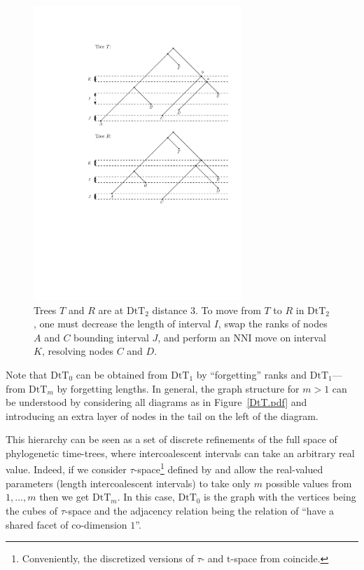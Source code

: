 \documentclass{amsart}
\theoremstyle{definition}
\newcommand{\dtt}{\mathrm{DtT}}
\begin{document}
\begin{figure}[ht]
\centering
\includegraphics[width=0.7\textwidth]{dts_neighbors.pdf}
\caption{Trees $T$ and $R$ are at $\dtt_2$ distance $3$.
To move from $T$ to $R$ in $\dtt_2$, one must decrease the length of interval $I$, swap the ranks of nodes $A$ and $C$ bounding interval $J$, and perform an NNI move on interval $K$, resolving nodes $C$ and $D$.}
\label{dts_neighbors.pdf}
\end{figure}

Note that $\dtt_0$ can be obtained from $\dtt_1$ by ``forgetting'' ranks and $\dtt_1$---from $\dtt_m$ by forgetting lengths.
In general, the graph structure for $m > 1$ can be understood by considering all diagrams as in Figure~\ref{DtT.pdf} and introducing an extra layer of nodes in the tail on the left of the diagram.

This hierarchy can be seen as a set of discrete refinements of the full space of phylogenetic time-trees, where intercoalescent intervals can take an arbitrary real value.
Indeed, if we consider
$\tau$-space\footnote{Conveniently, the discretized versions of $\tau$- and $\mathrm t$-space from \autocite{Gavryushkin2014-bw} coincide.}
defined by \textcite{Gavryushkin2014-bw} and allow the real-valued parameters (length intercoalescent intervals) to take only $m$ possible values from $1,\ldots,m$ then we get $\dtt_m$.
In this case, $\dtt_0$ is the graph with the vertices being the cubes of $\tau$-space and the adjacency relation being the relation of ``have a shared facet of co-dimension $1$''.
\end{document}
